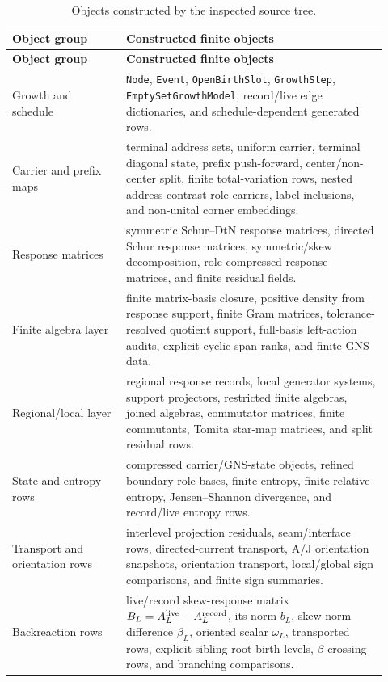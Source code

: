 \documentclass[11pt]{article}
\theoremstyle{remark}
\newcommand{\code}[1]{\texttt{#1}}
\numberwithin{equation}{section}
\begin{document}
\begin{longtable}{>{\raggedright\arraybackslash}p{0.28\linewidth}>{\raggedright\arraybackslash}p{0.64\linewidth}}
\caption{Objects constructed by the inspected source tree.}\label{tab:constructed-objects}\\
\toprule
\textbf{Object group} & \textbf{Constructed finite objects}\\
\midrule
\endfirsthead
\toprule
\textbf{Object group} & \textbf{Constructed finite objects}\\
\midrule
\endhead
Growth and schedule & \code{Node}, \code{Event}, \code{OpenBirthSlot}, \code{GrowthStep}, \code{EmptySetGrowthModel}, record/live edge dictionaries, and schedule-dependent generated rows.\\
\hline
Carrier and prefix maps & terminal address sets, uniform carrier, terminal diagonal state, prefix push-forward, center/non-center split, finite total-variation rows, nested address-contrast role carriers, label inclusions, and non-unital corner embeddings.\\
\hline
Response matrices & symmetric Schur--DtN response matrices, directed Schur response matrices, symmetric/skew decomposition, role-compressed response matrices, and finite residual fields.\\
\hline
Finite algebra layer & finite matrix-basis closure, positive density from response support, finite Gram matrices, tolerance-resolved quotient support, full-basis left-action audits, explicit cyclic-span ranks, and finite GNS data.\\
\hline
Regional/local layer & regional response records, local generator systems, support projectors, restricted finite algebras, joined algebras, commutator matrices, finite commutants, Tomita star-map matrices, and split residual rows.\\
\hline
State and entropy rows & compressed carrier/GNS-state objects, refined boundary-role bases, finite entropy, finite relative entropy, Jensen--Shannon divergence, and record/live entropy rows.\\
\hline
Transport and orientation rows & interlevel projection residuals, seam/interface rows, directed-current transport, A/J orientation snapshots, orientation transport, local/global sign comparisons, and finite sign summaries.\\
\hline
Backreaction rows & live/record skew-response matrix $B_L=A_L^{\rm live}-A_L^{\rm record}$, its norm $b_L$, skew-norm difference $\beta_L$, oriented scalar $\omega_L$, transported rows, explicit sibling-root birth levels, $\beta$-crossing rows, and branching comparisons.\\
\bottomrule
\end{longtable}
\end{document}
